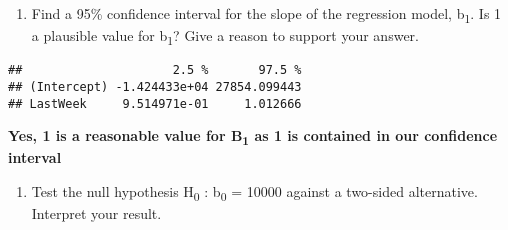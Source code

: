 \documentclass[
]{article}
\newenvironment{Shaded}{\begin{snugshade}}{\end{snugshade}}
\newcommand{\AttributeTok}[1]{\textcolor[rgb]{0.77,0.63,0.00}{#1}}
\newcommand{\CommentTok}[1]{\textcolor[rgb]{0.56,0.35,0.01}{\textit{#1}}}
\newcommand{\DecValTok}[1]{\textcolor[rgb]{0.00,0.00,0.81}{#1}}
\newcommand{\FloatTok}[1]{\textcolor[rgb]{0.00,0.00,0.81}{#1}}
\newcommand{\FunctionTok}[1]{\textcolor[rgb]{0.00,0.00,0.00}{#1}}
\newcommand{\NormalTok}[1]{#1}
\newcommand{\SpecialCharTok}[1]{\textcolor[rgb]{0.00,0.00,0.00}{#1}}
\newcommand{\StringTok}[1]{\textcolor[rgb]{0.31,0.60,0.02}{#1}}
\providecommand{\tightlist}{%
  \setlength{\itemsep}{0pt}\setlength{\parskip}{0pt}}
\begin{document}
\begin{enumerate}
\def\labelenumi{(\alph{enumi})}
\tightlist
\item
  Find a 95\% confidence interval for the slope of the regression model,
  b\textsubscript{1}. Is 1 a plausible value for b\textsubscript{1}?
  Give a reason to support your answer.
\end{enumerate}

\begin{Shaded}
\end{Shaded}

\begin{Shaded}
\end{Shaded}

\begin{verbatim}
##                     2.5 %       97.5 %
## (Intercept) -1.424433e+04 27854.099443
## LastWeek     9.514971e-01     1.012666
\end{verbatim}

\textbf{Yes, 1 is a reasonable value for B\textsubscript{1} as 1 is
contained in our confidence interval}

\begin{enumerate}
\def\labelenumi{(\alph{enumi})}
\setcounter{enumi}{1}
\tightlist
\item
  Test the null hypothesis H\textsubscript{0} : b\textsubscript{0} =
  10000 against a two-sided alternative. Interpret your result.
\end{enumerate}
\end{document}

